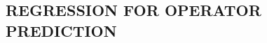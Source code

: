 \documentclass[english]{article}
\theoremstyle{plain}
\theoremstyle{plain}
\newcommand{\wjnote}[1]{ }
\newcommand{\aenote}[1]{}
\begin{document}

% 


\subsection{REGRESSION FOR OPERATOR PREDICTION}\label{sec:ridgeRegression}







\end{document}
